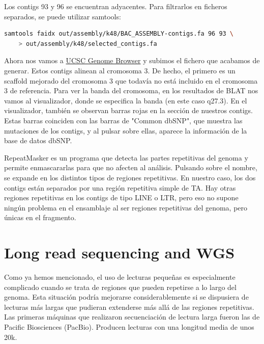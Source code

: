 \begin{itemize}
Los contigs 93 y 96 se encuentran adyacentes. Para filtrarlos en ficheros separados, se puede utilizar samtools:
\begin{lstlisting}[language=bash]
samtools faidx out/assembly/k48/BAC_ASSEMBLY-contigs.fa 96 93 \
    > out/assembly/k48/selected_contigs.fa
\end{lstlisting}
Ahora nos vamos a \href{http://genome.ucsc.edu}{UCSC Genome Browser} y subimos el fichero que acabamos de generar. Estos contigs alinean al cromosoma 3. De hecho, el primero es un scaffold mejorado del cromosoma 3 que todavía no está incluido en el cromosoma 3 de referencia. Para ver la banda del cromosoma, en los resultados de BLAT nos vamos al visualizador, donde se especifica la banda (en este caso q27.3). En el visualizador, también se observan barras rojas en la sección de nuestros contigs. Estas barras coinciden con las barras de "Common dbSNP", que muestra las mutaciones de los contigs, y al pulsar sobre ellas, aparece la información de la base de datos dbSNP.

RepeatMasker es un programa que detecta las partes repetitivas del genoma y permite enmascararlas para que no afecten al análisis. Pulsando sobre el nombre, se expande en los distintos tipos de regiones repetitivas. En nuestro caso, los dos contigs están separados por una región repetitiva simple de TA. Hay otras regiones repetitivas en los contigs de tipo LINE o LTR, pero eso no supone ningún problema en el ensamblaje al ser regiones repetitivas del genoma, pero únicas en el fragmento. 

\section{Long read sequencing and WGS}
Como ya hemos mencionado, el uso de lecturas pequeñas es especialmente complicado cuando se trata de regiones que pueden repetirse a lo largo del genoma. Esta situación podría mejorarse considerablemente si se dispusiera de lecturas más largas que pudieran extenderse más allá de las regiones repetitivas. Las primeras máquinas que realizaron secuenciación de lectura larga fueron las de Pacific Biosciences (PacBio). Producen lecturas con una longitud media de unos 20k.


\end{itemize}
